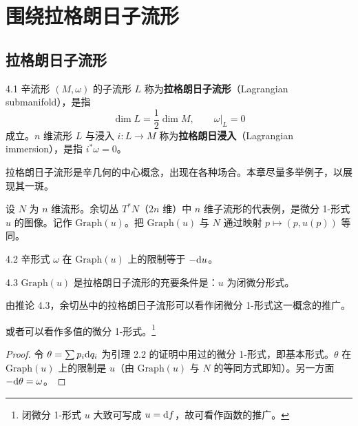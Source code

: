 \chapter{围绕拉格朗日子流形}

\section{拉格朗日子流形}


\begin{definition}{4.1}
  辛流形 $(M,\omega)$ 的子流形 $L$ 称为\textbf{拉格朗日子流形}（Lagrangian submanifold），是指
  \[
    \dim L=\frac12\dim M,\qquad \omega|_L=0
  \]
  成立。$n$ 维流形 $L$ 与浸入 $i:L\to M$ 称为\textbf{拉格朗日浸入}（Lagrangian immersion），是指 $i^*\omega=0$。
\end{definition}

拉格朗日子流形是辛几何的中心概念，出现在各种场合。本章尽量多举例子，以展现其一斑。

设 $N$ 为 $n$ 维流形。余切丛 $T^*N$（$2n$ 维）中 $n$ 维子流形的代表例，是微分 1-形式 $u$ 的图像。记作 $\mathrm{Graph}(u)$。把 $\mathrm{Graph}(u)$ 与 $N$ 通过映射 $p\mapsto(p,u(p))$ 等同。

\begin{lemma}{4.2}
  辛形式 $\omega$ 在 $\mathrm{Graph}(u)$ 上的限制等于 $-\mathrm{d} u$。
\end{lemma}

\begin{corollary}{4.3}
  $\mathrm{Graph}(u)$ 是拉格朗日子流形的充要条件是：$u$ 为闭微分形式。
\end{corollary}

由推论 4.3，余切丛中的拉格朗日子流形可以看作闭微分 1-形式这一概念的推广。

或者可以看作多值的微分 1-形式。\footnote{闭微分 1-形式 $u$ 大致可写成 $u=\mathrm{d} f$，故可看作函数的推广。}

\begin{proof}
  令 $\theta=\sum p_i\mathrm{d} q_i$ 为引理 2.2 的证明中用过的微分 1-形式，即基本形式。$\theta$ 在 $\mathrm{Graph}(u)$ 上的限制是 $u$（由 $\mathrm{Graph}(u)$ 与 $N$ 的等同方式即知）。另一方面 $-\mathrm{d}\theta=\omega$。
\end{proof}

